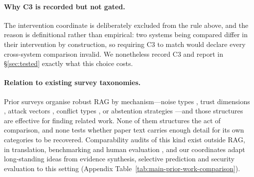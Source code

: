 \paragraph{Why C3 is recorded but not gated.}
The intervention coordinate is deliberately excluded from the rule above, and the reason is
definitional rather than empirical: two systems being compared differ in their intervention by
construction, so requiring C3 to match would declare every cross-system comparison invalid.
We nonetheless record C3 and report in \S\ref{sec:tested} exactly what this choice costs.

\paragraph{Relation to existing survey taxonomies.}
Prior surveys organise robust RAG by mechanism---noise types \citep{ragSurvey2024}, trust
dimensions \citep{trustRAGCompass2024}, attack vectors \citep{securityRAGSurvey2026}, conflict
types \citep{xuKnowledgeConflicts2024}, or abstention strategies \citep{wenAbstentionSurvey2025}---and
those structures are effective for finding related work. None of them structures the act of
comparison, and none tests whether paper text carries enough detail for its own categories to be
recovered. Comparability audits of this kind exist outside RAG, in translation, benchmarking and
human evaluation \citep{marie2021credibility,howcroft2020twenty,gehrmann2023cracked}, and our
coordinates adapt long-standing ideas from evidence synthesis, selective prediction and security
evaluation \citep{richardson1995pico,chow1970reject,papernot2018sok} to this setting (Appendix
Table~\ref{tab:main-prior-work-comparison}).
